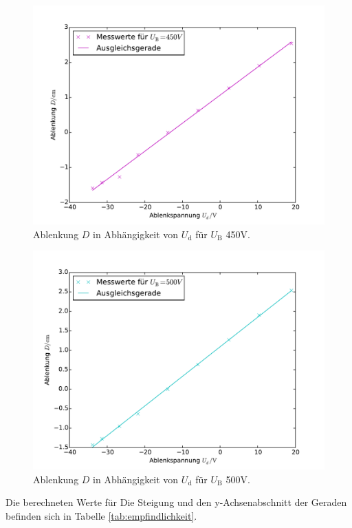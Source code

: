 \begin{figure}
  \centering
  \includegraphics[scale=0.8]{auswertung/501-a6.pdf}
\caption{Ablenkung $D$ in Abhängigkeit von $U_\mathrm{d}$ für $U_\mathrm{B}$ 450\si{\volt}.}
  \label{fig:empfindlichkeit6}
\end{figure}

\begin{figure}
  \centering
  \includegraphics[scale=0.8]{auswertung/501-a7.pdf}
\caption{Ablenkung $D$ in Abhängigkeit von $U_\mathrm{d}$ für $U_\mathrm{B}$ 500\si{\volt}.}
  \label{fig:empfindlichkeit7}
\end{figure}


Die berechneten Werte für Die Steigung und den y-Achsenabschnitt der Geraden befinden sich in Tabelle \ref{tab:empfindlichkeit}.

